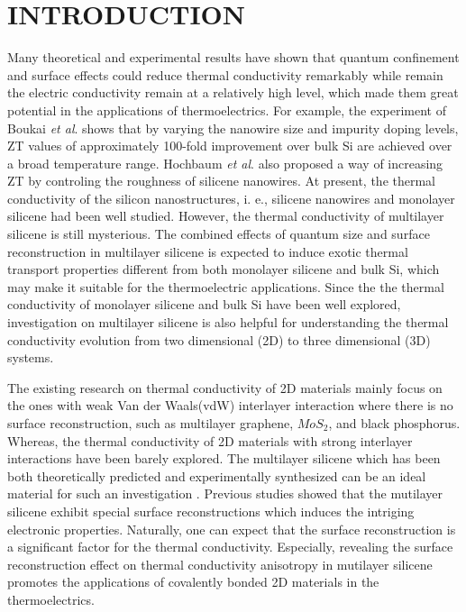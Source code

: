 \documentclass[aps,prb,twocolumn,showpacs,amsmath,amssymb]{revtex4-1}
\begin{document}
\maketitle

\section{INTRODUCTION}

Many theoretical and experimental results have shown that quantum confinement and surface effects could reduce thermal conductivity remarkably while remain the electric conductivity remain at a relatively high level, which made them great potential in the applications of thermoelectrics. For example, the experiment of Boukai \emph{et al}.\cite{Boukai2008} shows that by varying the nanowire size and impurity doping levels, ZT values of approximately 100-fold improvement over bulk Si are achieved over a broad temperature range. Hochbaum \emph{et al}.\cite{Hochbaum2008} also proposed a way of increasing ZT by controling the roughness of silicene nanowires. At present, the thermal conductivity of the silicon nanostructures, i. e.,  silicene nanowires\cite{Hochbaum2008,Yang2010,Shi2009,Boukai2008} and monolayer silicene\cite{Pei2013,Ng2013,Xie2014,Zhang2014,Liu2014,Wang2015,Zhang2015a,Chen2016} had been well studied. However, the thermal conductivity of multilayer silicene is still mysterious.
The combined effects of quantum size and surface reconstruction in multilayer silicene is expected to induce exotic thermal transport properties different from both monolayer silicene and bulk Si,  which may make it suitable for the thermoelectric applications. Since the the thermal conductivity of monolayer silicene and  bulk Si have been well explored, investigation on multilayer silicene is also helpful for understanding the thermal conductivity  evolution from two dimensional (2D) to three dimensional (3D) systems.

The existing research on thermal conductivity of  2D materials  mainly focus on the ones with weak Van der Waals(vdW) interlayer interaction where there is no surface reconstruction, such as multilayer graphene\cite{Lindsay2011,Ni2012,Wang2011}, $MoS_2$\cite{Liu2015}, and black phosphorus\cite{Zhang2015,Peng2015,Jain2015}.  Whereas, the thermal conductivity of 2D materials with strong interlayer interactions have been barely explored.
The multilayer silicene which has been both theoretically predicted and experimentally synthesized can be an ideal material for such an investigation
\cite{Fu2014,Padova2016,Guo2015Structural}.
Previous studies  showed that the mutilayer silicene exhibit special surface reconstructions which induces the intriging electronic properties\cite{Fu2014,Guo2015Structural}. Naturally, one can expect that  the surface reconstruction is a significant factor for the thermal conductivity.
Especially, revealing the surface reconstruction effect on thermal conductivity anisotropy  in mutilayer silicene  promotes the applications of covalently bonded 2D materials in the thermoelectrics.
\end{document}
